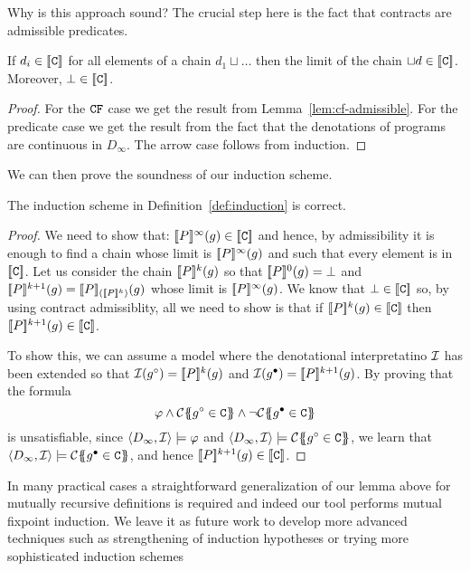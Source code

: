 Why is this approach sound? The crucial step here is the fact that contracts are admissible predicates.
\begin{theorem}
If $d_i \in \dbrace{\Ct}$ for all elements of a chain $d_1 \sqcup \ldots$ then the limit of the chain 
$\sqcup d \in \dbrace{\Ct}$. Moreover, $\bot \in \dbrace{\Ct}$.
\end{theorem}
\begin{proof}
For the $\CF$ case we get the result from Lemma~\ref{lem:cf-admissible}. 
For the predicate case we get the result from the fact that the denotations of programs 
are continuous in $D_{\infty}$. The arrow case follows from induction.
\end{proof}

We can then prove the soundness of our induction scheme.
\begin{theorem} The induction scheme in Definition~\ref{def:induction} is correct. \end{theorem}
\begin{proof} We need to show that: 
$\dbrace{P}^{\infty}(g) \in \dbrace{\Ct}$ and hence, by admissibility it is enough to find
a chain whose limit is $\dbrace{P}^{\infty}(g)$ and such that every element is in $\dbrace{\Ct}$.
Let us consider the chain $\dbrace{P}^{k}(g)$ so that $\dbrace{P}^0(g) = \bot$ and 
$\dbrace{P}^{k+1}(g) = \dbrace{P}_{(\dbrace{P}^{k})}(g)$ whose limit is $\dbrace{P}^{\infty}(g)$. We 
know that $\bot \in \dbrace{\Ct}$ so, by using contract admissiblity, all we need to show is
that if $\dbrace{P}^{k}(g) \in \dbrace{\Ct}$ then $\dbrace{P}^{k+1}(g) \in \dbrace{\Ct}$. 

To show this, we can assume a model where the denotational interpretatino ${\cal I}$ has been 
extended so that ${\cal I}(g^{\circ}) = \dbrace{P}^{k}(g)$ and ${\cal I}(g^{\bullet}) = \dbrace{P}^{k+1}(g)$.
By proving that the formula 
\[ \phi \land \ctrans{}{}{g^{\circ} \in \Ct} \land \neg \ctrans{}{}{g^{\bullet} \in \Ct} \] 
is unsatisfiable, since $\langle D_{\infty},{\cal I}\rangle \models \phi$ and 
$\langle D_{\infty},{\cal I}\rangle \models \ctrans{}{}{g^{\circ} \in \Ct}$, we learn 
that $\langle D_{\infty},{\cal I}\rangle \models \ctrans{}{}{g^{\bullet} \in \Ct}$, 
and hence $\dbrace{P}^{k+1}(g) \in \dbrace{\Ct}$.
\end{proof} 

In many practical cases a straightforward generalization of our lemma above for mutually recursive definitions
is required and indeed our tool performs mutual fixpoint induction. We leave it as future work to develop
more advanced techniques such as strengthening of induction hypotheses or trying more sophisticated induction 
schemes~\cite{dan's master thesis??}  


